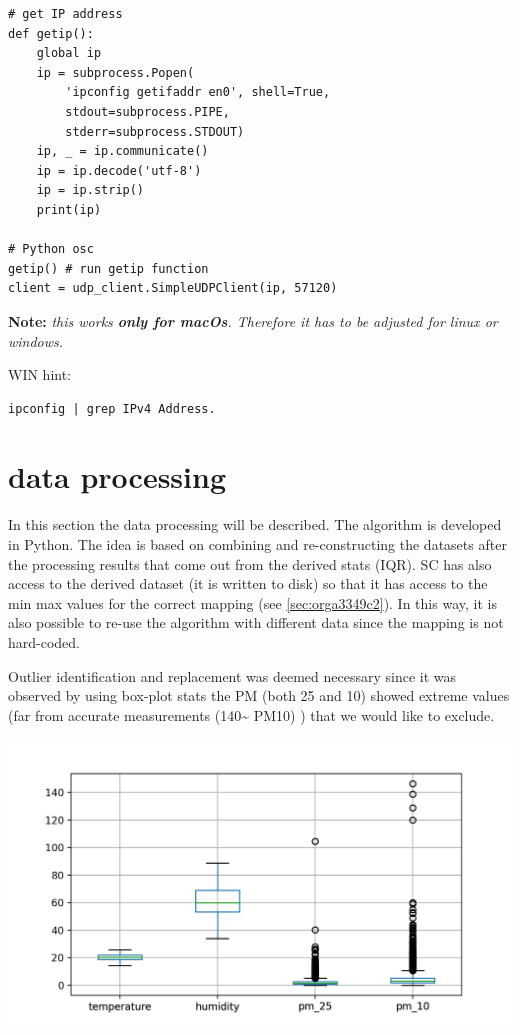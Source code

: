 \documentclass[11pt]{article}
\begin{document}
\begin{verbatim}
# get IP address
def getip():
    global ip
    ip = subprocess.Popen(
        'ipconfig getifaddr en0', shell=True,
        stdout=subprocess.PIPE,
        stderr=subprocess.STDOUT)
    ip, _ = ip.communicate()
    ip = ip.decode('utf-8')
    ip = ip.strip()
    print(ip)

# Python osc
getip() # run getip function
client = udp_client.SimpleUDPClient(ip, 57120)
\end{verbatim}
\textbf{Note:} \emph{this works \textbf{only for macOs}.  Therefore it has to be adjusted for linux or windows.}

\vspace{0.2cm}
\noindent
WIN hint:
\begin{verbatim}
ipconfig | grep IPv4 Address.
\end{verbatim}

\section{data processing}
\label{sec:org048cbec}
In this section the data processing will be described.  The algorithm is developed in Python.  The idea is based on combining and re-constructing the datasets after the processing results that come out from the derived stats (IQR).  SC has also access to the derived dataset (it is written to disk) so that it has access to the min max values for the correct mapping (see \ref{sec:orga3349c2}).  In this way, it is also possible to re-use the algorithm with different data since the mapping is not hard-coded.

Outlier identification and replacement was deemed necessary since it was observed by using box-plot stats the PM (both 25 and 10) showed extreme values (far from accurate measurements (140\textasciitilde{} PM10) ) that we would like to exclude.

\begin{center}
\includegraphics[width=.9\linewidth]{./boxplot.png}
\end{center}
\end{document}
